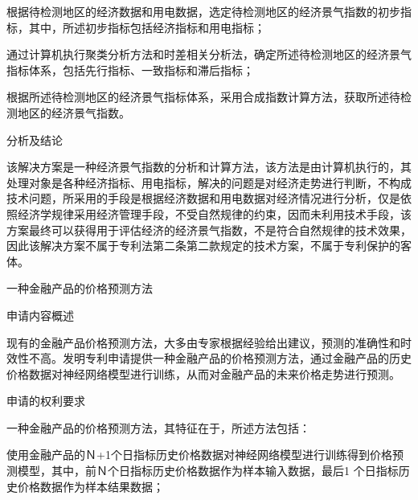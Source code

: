 {\setlength{\parindent}{20.6bp}根据待检测地区的经济数据和用电数据，选定待检测地区的经济景气指数的初步指标，其中，所述初步指标包括经济指标和用电指标；\par}

{\setlength{\parindent}{20.6bp}通过计算机执行聚类分析方法和时差相关分析法，确定所述待检测地区的经济景气指标体系，包括先行指标、一致指标和滞后指标；\par}

{\setlength{\parindent}{20.6bp}根据所述待检测地区的经济景气指标体系，采用合成指数计算方法，获取所述待检测地区的经济景气指数。\par}

{\setlength{\parindent}{20.1bp}分析及结论\par}

{\setlength{\parindent}{20.6bp}该解决方案是一种经济景气指数的分析和计算方法，该方法是由计算机执行的，其处理对象是各种经济指标、用电指标，解决的问题是对经济走势进行判断，不构成技术问题，所采用的手段是根据经济数据和用电数据对经济情况进行分析，仅是依照经济学规律采用经济管理手段，不受自然规律的约束，因而未利用技术手段，该方案最终可以获得用于评估经济的经济景气指数，不是符合自然规律的技术效果，因此该解决方案不属于专利法第二条第二款规定的技术方案，不属于专利保护的客体。\par}

{\setlength{\parindent}{15.3bp}\par}

{\setlength{\parindent}{20.6bp}一种金融产品的价格预测方法\par}

{\setlength{\parindent}{20.1bp}申请内容概述\par}

{\setlength{\parindent}{20.6bp}现有的金融产品价格预测方法，大多由专家根据经验给出建议，预测的准确性和时效性不高。发明专利申请提供一种金融产品的价格预测方法，通过金融产品的历史价格数据对神经网络模型进行训练，从而对金融产品的未来价格走势进行预测。\par}

{\setlength{\parindent}{20.1bp}申请的权利要求\par}

{\setlength{\parindent}{20.6bp}一种金融产品的价格预测方法，其特征在于，所述方法包括：\par}

{\setlength{\parindent}{20.6bp}使用金融产品的Ｎ+1个日指标历史价格数据对神经网络模型进行训练得到价格预测模型，其中，前Ｎ个日指标历史价格数据作为样本输入数据，最后1 个日指标历史价格数据作为样本结果数据；\par}


